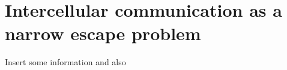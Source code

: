 \documentclass[../main.tex]{subfiles}
\begin{document}
\chapter{Intercellular communication as a narrow escape problem}
\label{cha:narrowescape}

Insert some information \cite{basselMulticellularSystemsBiology2019} and also \cite{hughesNonDestructiveHighContentAnalysis2017}
\end{document}
